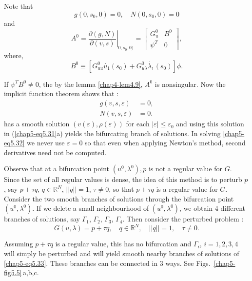 Note that 
$$
g(0,s_0,0) = 0, \quad N(0,s_0,0) =0
$$
and 
$$
A^0 = \left. \frac{\partial(g,N)}{\partial(v,s)}
\right|_{0,s_0,0)}=
 \begin{bmatrix}
   G^0_u & B^0 \\
 \psi^T &  0 
\end{bmatrix}, 
$$
where,
$$
B^0 \equiv \left[G^0_{u u } \dot{u_1} (s_0) + G^0_{u \lambda}
  \dot{\lambda_1} (s_0) \right] \phi. 
$$

If $\psi^T B^0 \neq 0$, the by the lemma \ref{chap4-lem4.9}, $A^0$ is
nonsingular. Now 
the implicit function theorem shows that :  
\begin{equation*}
\begin{split}
g(v,s,\varepsilon) & = 0,\\
N(v,s,\varepsilon) & = 0. 
\end{split}\tag{5.32}\label{chap5-eq5.32}
\end{equation*}
has a smooth solution $(v(\varepsilon), \rho (\varepsilon))$ for each
$|\varepsilon| \leq \varepsilon_0$ and using this solution in
(\ref{chap5-eq5.31}a) yields the bifurcating branch of solutions. In solving
\eqref{chap5-eq5.32} we never use $\varepsilon = 0$ so that even when applying
Newton's method, second derivatives need not be computed. 

\medskip
{}
Observe that at a bifurcation point $(u^0, \lambda^0),p$ is not a
regular value for $G$. Since the set of all regular values is dense,
the idea of this method is to perturb $p$, say $p+ \tau q$, $q
\in \mathbb{R}^N$, $||q||= 1$, $\tau \neq 0$, so that $p +
\tau q $ is a regular value for $G$.   
Consider\pageoriginale 
the two smooth branches of solutions through the bifurcation
point $(u^0,\lambda^0)$. If we delete a small neighbourhood of
$(u^0,\lambda^0)$, we obtain 4 different branches of solutions, say
$\Gamma_1$, $\Gamma_2$, $\Gamma_3$, $\Gamma_4$. Then consider the
perturbed problem :   
\begin{equation*}
G(u,\lambda) = p+ \tau q , \quad q \in \mathbb{R}^N, \quad || q|| = 1,
\quad \tau \neq 0. \tag{5.33}\label{chap5-eq5.33} 
\end{equation*}

Assuming $p + \tau q$ is a regular value, this has no bifurcation and
$\Gamma_i$, $i = 1,2,3,4$ will simply be perturbed and will yield smooth
nearby branches of solutions of \eqref{chap5-eq5.33}. These branches can be
connected in 3 ways. See Figs.~\ref{chap5-fig5.5}\,a,b,c. 

